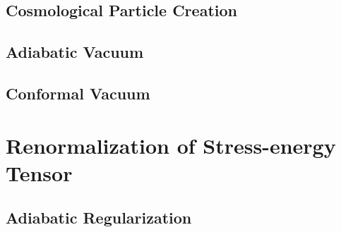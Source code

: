 \documentclass[12pt]{article}
\numberwithin{equation}{section}
\theoremstyle{1style}
\newcommand{\id}{\mathrm{d}}
\begin{document}
\begin{comment}
  \delta\left(\frac{(\omega-\mathbf{k}\cdot\mathbf{v})}{\sqrt{1-v^2}}-E\right)n_{\mathbf{k}}                                          \\
                           & = (2\pi)^{1-n}(2\pi)\frac{2\pi^{\frac{n-1}{2}}}{\Gamma(\frac{n-1}{2})}\int\frac{k^{n-2}\id k}{2\omega}\;
  \delta\left(\omega-E\right)n_{\mathbf{k}}                                                                                           \\
                           & = \frac{2^{2-n}\pi^{\frac{3-n}{2}}}{\Gamma(\frac{n-1}{2})}\int\frac{k^{n-2}\id k}{\omega}\;
  \delta\left(\omega-E\right)n_{\mathbf{k}}                                                                                           \\
                           & = \frac{2^{2-n}\pi^{\frac{3-n}{2}}}{\Gamma(\frac{n-1}{2})}\int\frac{k^{n-2}\id k}{\sqrt{k^2+m^2}}\;
  \delta\left(\sqrt{k^2+m^2}-E\right)n_{\sqrt{E^2-m^2}}                                                                               \\
                           & = \frac{2^{2-n}\pi^{\frac{3-n}{2}}}{\Gamma(\frac{n-1}{2})}\left(E^2-m^2\right)^{\frac{n-3}{2}}
  \theta\left(E-m\right)n_{\sqrt{E^2-m^2}}
\end{align}
\end{comment}


\subsection{Cosmological Particle Creation}

\subsection{Adiabatic Vacuum}

\subsection{Conformal Vacuum}

\newpage

\section{Renormalization of Stress-energy Tensor}
\subsection{Adiabatic Regularization}
\end{document}

